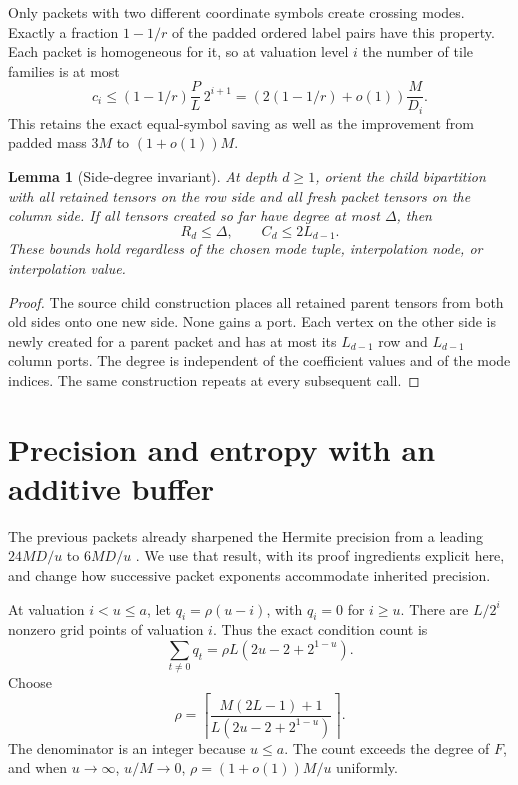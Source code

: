 \documentclass[11pt,letterpaper]{article}
\newtheorem{lemma}[theorem]{Lemma}
\theoremstyle{remark}\newtheorem{remark}[theorem]{Remark}
\begin{document}
Only packets with two different coordinate symbols create crossing
modes. Exactly a fraction $1-1/r$ of the padded ordered label pairs
have this property. Each packet is homogeneous for it, so at valuation
level $i$ the number of tile families is at most
\begin{equation}\label{eq:family-count}
 c_i\le(1-1/r)\frac{P}{L}\,2^{i+1}
     =\left(2(1-1/r)+o(1)\right)\frac{M}{D_i}.
\end{equation}
This retains the exact equal-symbol saving as well as the improvement
from padded mass $3M$ to $(1+o(1))M$.

\begin{lemma}[Side-degree invariant]\label{lem:side-degree}
At depth $d\ge1$, orient the child bipartition with all retained tensors
on the row side and all fresh packet tensors on the column side.
If all tensors created so far have degree at most $\Delta$, then
\[
 R_d\le\Delta,\qquad C_d\le2L_{d-1}.
\]
These bounds hold regardless of the chosen mode tuple, interpolation
node, or interpolation value.
\end{lemma}
\begin{proof}
The source child construction places all retained parent tensors from
both old sides onto one new side. None gains a port. Each vertex on the
other side is newly created for a parent packet and has at most its
$L_{d-1}$ row and $L_{d-1}$ column ports. The degree is independent of the
coefficient values and of the mode indices. The same construction repeats
at every subsequent call.
\end{proof}

\section{Precision and entropy with an additive buffer}
\label{sec:precision}
The previous packets already sharpened the Hermite precision from a
leading $24MD/u$ to $6MD/u$ \cite{contractionpacket,precisionpacket}.
We use that result, with its proof ingredients explicit here, and change
how successive packet exponents accommodate inherited precision.

At valuation $i<u\le a$, let $q_i=\rho(u-i)$, with $q_i=0$ for $i\ge u$.
There are $L/2^i$ nonzero grid points of valuation $i$. Thus the exact
condition count is
\begin{equation}\label{eq:condition-count}
 \sum_{t\ne0}q_t=\rho L(2u-2+2^{1-u}).
\end{equation}
Choose
\begin{equation}\label{eq:taper}
 \rho=\left\lceil
 \frac{M(2L-1)+1}{L(2u-2+2^{1-u})}
 \right\rceil.
\end{equation}
The denominator is an integer because $u\le a$. The count exceeds the
degree of $F$, and when $u\to\infty$, $u/M\to0$,
$\rho=(1+o(1))M/u$ uniformly.
\end{document}
